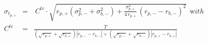 


\begin{eqnarray*}
  \sigma_{t_{p,+}} & = & \ C^{te} \cdot \sqrt{r_{p,+}\left( \sigma_{p,-}^2 +
\sigma_{b,-}^2
          \right)  + \frac{\sigma_{p,+}^2} {4\,r_{p,+}}\,
          {\left( r_{p,-} - r_{b,-}\right) }^2} \ \ {\mathrm with}
\\
   C^{te} & = & \frac{T}
                 {\left( \sqrt{r_{p,+}} + \sqrt{r_{b,+}} \right)
                  \left| r_{p,-} - r_{b,-} \right| + 
                  \left( \sqrt{r_{p,-}} + \sqrt{r_{b,-}} \right)
                  \left| r_{p,+} - r_{b,+} \right|}
\end{eqnarray*}

